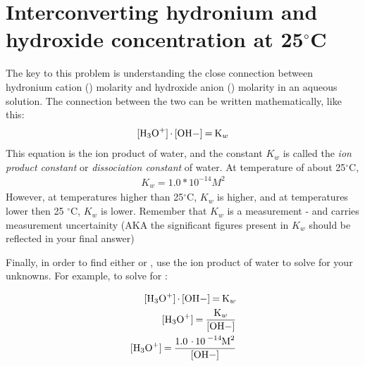 \documentclass{article}  %
\begin{document}
\section*{Interconverting hydronium and hydroxide concentration at 25$^{\circ}$C}
The key to this problem is understanding the close connection between hydronium cation () molarity and hydroxide anion () molarity in an aqueous solution. The connection between the two can be written mathematically, like this:
\begin{equation*}
    \begin{aligned}
        \ce{[H3O+]*[OH-] = K_w}
    \end{aligned}
\end{equation*}
This equation is the ion product of water, and the constant $K_w$ is called the \textit{ion product constant} or \textit{dissociation constant} of water. At temperature of about 25$^{\circ}$C,
\begin{equation*}
    \begin{aligned}
        K_w = 1.0*10^{-14} M^2
    \end{aligned}
\end{equation*}
However, at temperatures higher than 25$^{\circ}$C, $K_w$ is higher, and at temperatures lower then 25 $^{\circ}$C, $K_w$ is lower. Remember that $K_w$ is a measurement - and carries measurement uncertainity (AKA the significant figures present in $K_w$ should be reflected in your final answer)

Finally, in order to find either \ce{[H3O+]} or \ce{[OH-]}, use the ion product of water to solve for your unknowns. For example, to solve for \ce{[H3O+]}:

\begin{equation*}
    \begin{aligned}
        \ce{[H3O+]*[OH-] = K_w} \\
        \ce{[H3O+] = \frac{K_w}{[OH-]}} \\
        \ce{[H3O+] = \frac{1.0*10^{-14}M^2}{[OH-]}} 
    \end{aligned}
\end{equation*}
\end{document}
